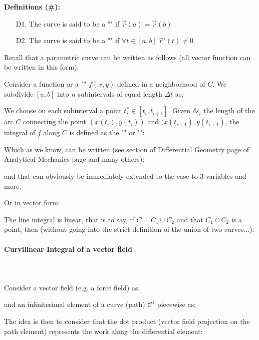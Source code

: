 	\textbf{Definitions (\#\mydef):}
	 \begin{enumerate}
	 	\item[D1.] The curve is said to be a "" if $\vec{r}(a)=\vec{r}(b)$
	 	
	 	\item[D2.] The curve is said to be a "" if $\forall t \in [a,b]\; \vec{r}'(t)\neq 0$
	 \end{enumerate}
	 Recall that a parametric curve can be written as follows (all vector function can be written in this form):
	 
	Consider a function or a "" $f(x,y)$ defined in a neighborhood of $C$. We subdivide $[a,b]$ into $n$ subintervals of equal length $\Delta t$ as:
	
	We choose on each subinterval a point $t_i^*\in [t_i,t_{i+1}]$. Given $\delta s_i$ the length of the arc $C$ connecting the point $(x(t_i),y(t_i))$ and $(x(t_{i+1}),y(t_{i+1})$, the integral of $f$ along $C$ is defined as the "" or "":
	
	Which as we know, can be written (see section of Differential Geometry page \pageref{curvilinear abscissa helix} of Analytical Mechanics page \pageref{parametric curve length} and many others):
	
	and that can obviously be immediately extended to the case to 3 variables and more.
	
	Or in vector form:
	
	The line integral is linear, that is to say, if $C=C_1 \cup C_2$ and that $C_1 \cap C_2$ is a point, then (without going into the strict definition of the union of two curves...):
	
	
	\paragraph{Curvilinear Integral of a vector field}\mbox{}\\\\
	Consider a vector field (e.g. a force field) as:
	
	and an infinitesimal element of a curve (path) $\mathcal{C}^1$ piecewise as:
	
	The idea is then to consider that the dot product (vector field projection on the path element) represents the work along the differential element:
	
